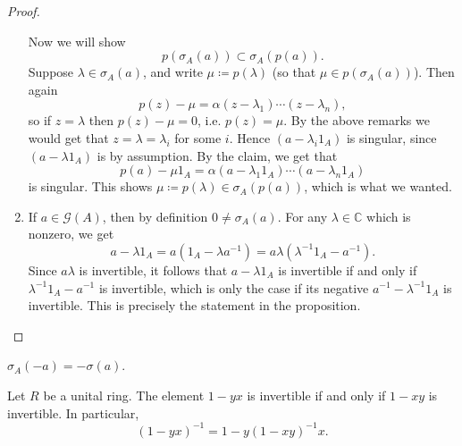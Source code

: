 \documentclass[12pt]{article}
\begin{document}
\begin{proof}
\begin{enumerate}
		Now we will show 
		\begin{equation*}
			p(\sigma_A(a)) \subset \sigma_A(p(a)).
		\end{equation*}
		Suppose $\lambda\in\sigma_A(a)$, and write $\mu\coloneqq p(\lambda)$ (so that $\mu\in p(\sigma_A(a))$). Then again 
		\begin{equation*}
			p(z) - \mu = \alpha(z-\lambda_1)\cdots(z-\lambda_n),
		\end{equation*}
		so if $z=\lambda$ then $p(z) - \mu = 0$, i.e. $p(z) = \mu$. By the above remarks we would get that $z=\lambda=\lambda_i$ for some $i$. Hence $(a-\lambda_i1_A)$ is singular, since $(a-\lambda 1_A)$ is by assumption. By the claim, we get that 
		\begin{equation*}
			p(a) - \mu 1_A = \alpha(a-\lambda_1 1_A)\cdots (a-\lambda_n 1_A)
		\end{equation*}
		is singular. This shows $\mu\coloneqq p(\lambda) \in \sigma_A(p(a))$, which is what we wanted.
		
	\item If $a\in\mathcal{G}(A)$, then by definition $0\neq \sigma_A(a)$. For any $\lambda\in\mathbb{C}$ which is nonzero, we get 
		\begin{equation*}
			a-\lambda 1_A = a(1_A - \lambda a^{-1}) = a\lambda (\lambda^{-1}1_A - a^{-1}).
		\end{equation*}
		Since $a\lambda$ is invertible, it follows that $a-\lambda 1_A$ is invertible if and only if $\lambda^{-1}1_A - a^{-1}$ is invertible, which is only the case if its negative $a^{-1} - \lambda^{-1} 1_A$ is invertible. This is precisely the statement in the proposition.
\end{enumerate}
\end{proof}

\begin{corollary}
	$\sigma_A(-a) = -\sigma(a)$.
\end{corollary}

\begin{proposition}
\label{prop_inverse_oneminusxy}
	Let $R$ be a unital ring. The element $1-yx$ is invertible if and only if $1-xy$ is invertible. In particular, 
	\begin{equation*}
		(1-yx)^{-1} = 1-y(1-xy)^{-1}x.
	\end{equation*}
\end{proposition}
\end{document}
